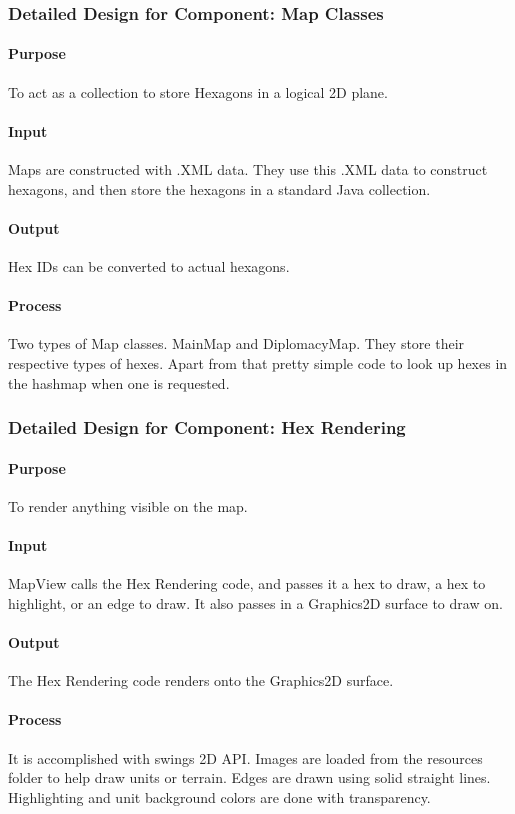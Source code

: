 \documentclass[12pt,a4paper,titlepage]{article}
\begin{document}
\subsubsection{Detailed Design for Component: Map Classes}
\paragraph{Purpose} To act as a collection to store Hexagons in a logical 2D plane.
\paragraph{Input}
Maps are constructed with .XML data. They use this .XML data to construct
hexagons, and then store the hexagons in a standard Java collection.
\paragraph{Output}
Hex IDs can be converted to actual hexagons.
\paragraph{Process}
Two types of Map classes. MainMap and DiplomacyMap. They store their respective
types of hexes. Apart from that pretty simple code to look up hexes in the hashmap
when one is requested.

\subsubsection{Detailed Design for Component: Hex Rendering}
\paragraph{Purpose} To render anything visible on the map.
\paragraph{Input}
MapView calls the Hex Rendering code, and passes it a hex to draw, a hex to highlight,
or an edge to draw. It also passes in a Graphics2D surface to draw on.
\paragraph{Output}
The Hex Rendering code renders onto the Graphics2D surface.
\paragraph{Process}
It is accomplished with swings 2D API. Images are
loaded from the resources folder to help draw units or terrain. 
Edges are drawn using solid straight lines.
Highlighting and unit background colors are done with transparency.
\end{document}
